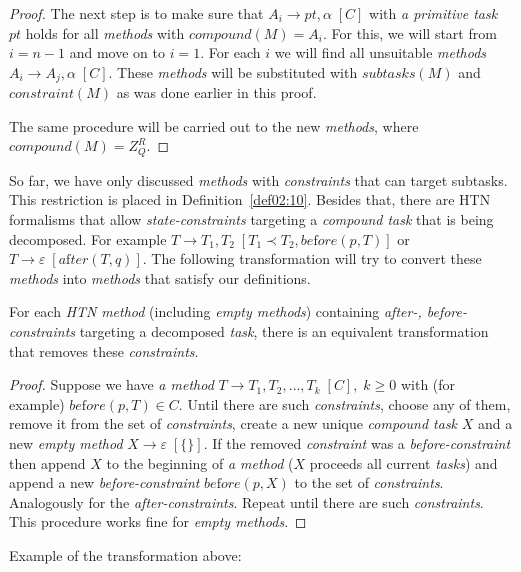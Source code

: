 \begin{proof}
    The next step is to make sure that $A_i \rightarrow pt, \alpha \; [C]$ with \emph{a primitive task} $pt$ holds for all \emph{methods} with $compound(M) = A_i$. For this, we will start from $i = n - 1$ and move on to $i = 1$. For each $i$ we will find all unsuitable \emph{methods} $A_i \rightarrow A_j, \alpha \; [C]$. These \emph{methods} will be substituted with $subtasks(M)$ and $constraint(M)$ as was done earlier in this proof.

    The same procedure will be carried out to the new \emph{methods}, where \\ $compound(M) = Z_Q^{R}$.
\end{proof}

\medskip\noindent
So far, we have only discussed \emph{methods} with \emph{constraints} that can target subtasks. This restriction is placed in Definition~\ref{def02:10}. Besides that, there are HTN formalisms that allow \emph{state-constraints} targeting a \emph{compound task} that is being decomposed. For example $T \rightarrow T_1, T_2 \; [T_1 \prec T_2, be\text{f}ore(p, T)]$ or $T \rightarrow \varepsilon \; [a\text{f}ter(T, q)]$. The following transformation will try to convert these \emph{methods} into \emph{methods} that satisfy our definitions.

\begin{thm}\label{thm04:14}
    For each \emph{HTN} \emph{method} (including \emph{empty methods}) containing \emph{after-, before-constraints} targeting a decomposed \emph{task}, there is an equivalent transformation that removes these \emph{constraints}. 
\end{thm}
\begin{proof}
    Suppose we have \emph{a method} $T \rightarrow T_1, T_2, \dots, T_k \; [C], \; k \geq 0$ with (for example) $be\text{f}ore(p, T) \in C$. Until there are such \emph{constraints}, choose any of them, remove it from the set of \emph{constraints}, create a new unique \emph{compound task} $X$ and a new \emph{empty method} $X \rightarrow \varepsilon \; [\{\}]$. If the removed \emph{constraint} was a \emph{before-constraint} then append $X$ to the beginning of \emph{a method} ($X$ proceeds all current \emph{tasks}) and append a new \emph{before-constraint} $be\text{f}ore(p,X)$ to the set of \emph{constraints}. Analogously for the \emph{after-constraints}. Repeat until there are such \emph{constraints}. This procedure works fine for \emph{empty methods}.
\end{proof}

\medskip\noindent
Example of the transformation above:

